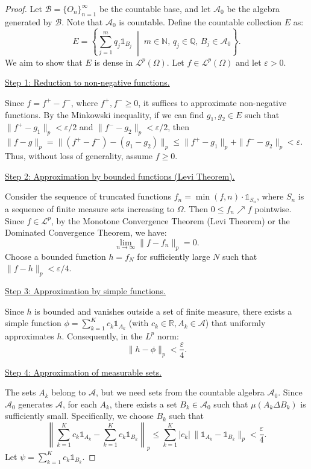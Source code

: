 \documentclass[12pt]{article}
\theoremstyle{blueplain}
\theoremstyle{bluedef}
\theoremstyle{blueremark}
\numberwithin{equation}{section}
\begin{document}
\begin{proof}
  Let $\mathcal{B} = \{O_n\}_{n=1}^\infty$ be the countable base, and let $\mathcal{A}_0$ be the algebra generated by $\mathcal{B}$. Note that $\mathcal{A}_0$ is countable. Define the countable collection $E$ as:
  \[
    E = \left\{ \sum_{j=1}^m q_j \mathds{1}_{B_j} \;\middle|\; m \in \mathds{N}, \, q_j \in \mathds{Q}, \, B_j \in \mathcal{A}_0 \right\}.
  \]
  We aim to show that $E$ is dense in $\mathcal{L}^p(\Omega)$. Let $f \in \mathcal{L}^p(\Omega)$ and let $\varepsilon > 0$.

  \underline{Step 1: Reduction to non-negative functions.}

  Since $f = f^+ - f^-$, where $f^+, f^- \ge 0$, it suffices to approximate non-negative functions. By the Minkowski inequality, if we can find $g_1, g_2 \in E$ such that $\|f^+ - g_1\|_p < \varepsilon/2$ and $\|f^- - g_2\|_p < \varepsilon/2$, then $\|f - g\|_p = \|(f^+ - f^-) - (g_1 - g_2)\|_p \le \|f^+ - g_1\|_p + \|f^- - g_2\|_p < \varepsilon$. Thus, without loss of generality, assume $f \ge 0$.

  \underline{Step 2: Approximation by bounded functions (Levi Theorem).}

  Consider the sequence of truncated functions $f_n = \min(f, n) \cdot \mathds{1}_{S_n}$, where $S_n$ is a sequence of finite measure sets increasing to $\Omega$. Then $0 \le f_n \nearrow f$ pointwise. Since $f \in \mathcal{L}^p$, by the Monotone Convergence Theorem (Levi Theorem) or the Dominated Convergence Theorem, we have:
  \[
    \lim_{n \to \infty} \|f - f_n\|_p = 0.
  \]
  Choose a bounded function $h = f_N$ for sufficiently large $N$ such that $\|f - h\|_p < \varepsilon/4$.

  \underline{Step 3: Approximation by simple functions.}

  Since $h$ is bounded and vanishes outside a set of finite measure, there exists a simple function $\phi = \sum_{k=1}^K c_k \mathds{1}_{A_k}$ (with $c_k \in \mathds{R}, A_k \in \mathcal{A}$) that uniformly approximates $h$. Consequently, in the $L^p$ norm:
  \[
    \|h - \phi\|_p < \frac{\varepsilon}{4}.
  \]

  \underline{Step 4: Approximation of measurable sets.}

  The sets $A_k$ belong to $\mathcal{A}$, but we need sets from the countable algebra $\mathcal{A}_0$. Since $\mathcal{A}_0$ generates $\mathcal{A}$, for each $A_k$, there exists a set $B_k \in \mathcal{A}_0$ such that $\mu(A_k \Delta B_k)$ is sufficiently small. Specifically, we choose $B_k$ such that
  \[
    \left\| \sum_{k=1}^K c_k \mathds{1}_{A_k} - \sum_{k=1}^K c_k \mathds{1}_{B_k} \right\|_p \le \sum_{k=1}^K |c_k| \, \|\mathds{1}_{A_k} - \mathds{1}_{B_k}\|_p < \frac{\varepsilon}{4}.
  \]
  Let $\psi = \sum_{k=1}^K c_k \mathds{1}_{B_k}$.


\end{proof}
\end{document}
